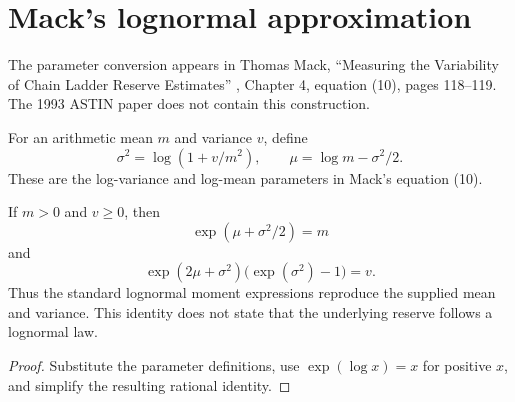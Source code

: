\chapter{Mack's lognormal approximation}

The parameter conversion appears in Thomas Mack, ``Measuring the Variability
of Chain Ladder Reserve Estimates'' \cite{Mack1994}, Chapter 4, equation (10),
pages 118--119. The 1993 ASTIN paper does not
contain this construction.

\begin{definition}\label{def:mack-lognormal}\leanok
For an arithmetic mean $m$ and variance $v$, define
\[
  \sigma^2=\log(1+v/m^2),
  \qquad
  \mu=\log m-\sigma^2/2.
\]
These are the log-variance and log-mean parameters in Mack's equation (10).
\end{definition}

\begin{theorem}\label{thm:mack-lognormal}\leanok
{}
If $m>0$ and $v\ge0$, then
\[
  \exp(\mu+\sigma^2/2)=m
\]
and
\[
  \exp(2\mu+\sigma^2)\bigl(\exp(\sigma^2)-1\bigr)=v.
\]
Thus the standard lognormal moment expressions reproduce the supplied mean
and variance. This identity does not state that the underlying reserve follows
a lognormal law.
\end{theorem}
\begin{proof}\leanok Substitute the parameter definitions, use
$\exp(\log x)=x$ for positive $x$, and simplify the resulting rational
identity.
\end{proof}
